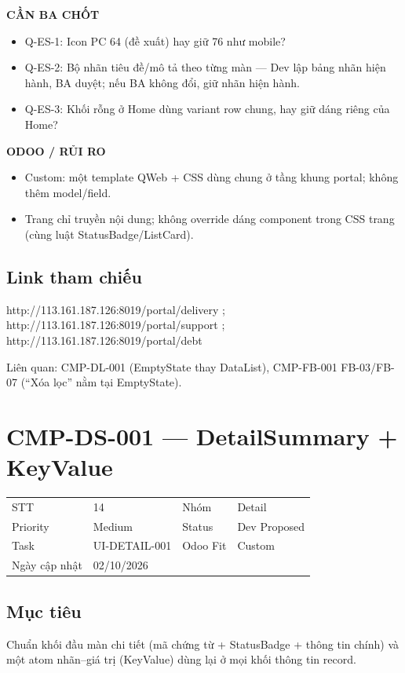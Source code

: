 \documentclass[11pt,a4paper]{report}
\begin{document}
\par\smallskip\textbf{CẦN BA CHỐT}\par
\begin{itemize}
\item Q-ES-1: Icon PC 64 (đề xuất) hay giữ 76 như mobile?
\item Q-ES-2: Bộ nhãn tiêu đề/\allowbreak{}mô tả theo từng màn — Dev lập bảng nhãn hiện hành, BA duyệt; nếu BA không đổi, giữ nhãn hiện hành.
\item Q-ES-3: Khối rỗng ở Home dùng variant row chung, hay giữ dáng riêng của Home?
\end{itemize}

\par\smallskip\textbf{ODOO / RỦI RO}\par
\begin{itemize}
\item Custom: một template QWeb + CSS dùng chung ở tầng khung portal; không thêm model/\allowbreak{}field.
\item Trang chỉ truyền nội dung; không override dáng component trong CSS trang (cùng luật StatusBadge/\allowbreak{}ListCard).
\end{itemize}
\subsection*{Link tham chiếu}
http://113.161.187.126:8019/\allowbreak{}portal/\allowbreak{}delivery ; http://113.161.187.126:8019/\allowbreak{}portal/\allowbreak{}support ; http://113.161.187.126:8019/\allowbreak{}portal/\allowbreak{}debt\par
Liên quan: CMP-DL-001 (EmptyState thay DataList), CMP-FB-001 FB-03/\allowbreak{}FB-07 (“Xóa lọc” nằm tại EmptyState).\par
\clearpage
\section{CMP-DS-001 --- DetailSummary + KeyValue}
\begin{tabularx}{\textwidth}{@{}l X l X@{}}\toprule
STT & 14 & Nhóm & Detail\\
Priority & Medium & Status & Dev Proposed\\
Task & UI-DETAIL-001 & Odoo Fit & Custom\\
Ngày cập nhật & 02/10/2026 & & \\\bottomrule\end{tabularx}
\subsection*{Mục tiêu}
Chuẩn khối đầu màn chi tiết (mã chứng từ + StatusBadge + thông tin chính) và một atom nhãn–giá trị (KeyValue) dùng lại ở mọi khối thông tin record.\par
\end{document}
